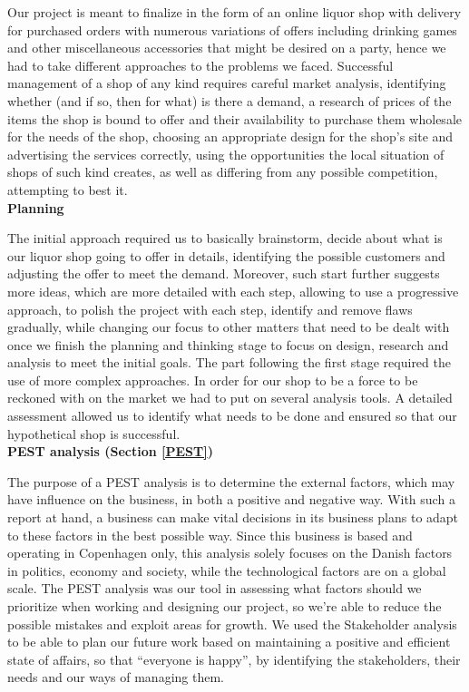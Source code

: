 \documentclass[12p]{article}
\begin{document}
Our project is meant to finalize in the form of an online liquor shop with delivery for purchased orders with numerous variations of offers including drinking games and other miscellaneous accessories that might be desired on a party, hence we had to take different approaches to the problems we faced. Successful management of a shop of any kind requires careful market analysis, identifying whether (and if so, then for what) is there a demand, a research of prices of the items the shop is bound to offer and their availability to purchase them wholesale for the needs of the shop, choosing an appropriate design for the shop’s site and advertising the services correctly, using the opportunities the local situation of shops of such kind creates, as well as differing from any possible competition, attempting to best it. \\

\textbf{Planning}

The initial approach required us to basically brainstorm, decide about what is our liquor shop going to offer in details, identifying the possible customers and adjusting the offer to meet the demand. Moreover, such start further suggests more ideas, which are more detailed with each step, allowing to use a progressive approach, to polish the project with each step, identify and remove flaws gradually, while changing our focus to other matters that need to be dealt with once we finish the planning and thinking stage to focus on design, research and analysis to meet the initial goals.
The part following the first stage required the use of more complex approaches. In order for our shop to be a force to be reckoned with on the market we had to put on several analysis tools. A detailed assessment allowed us to identify what needs to be done and ensured so that our hypothetical shop is successful. \\

\textbf{PEST analysis (Section \ref{PEST})}

The purpose of a PEST analysis is to determine the external factors, which may have influence on the business, in both a positive and negative way. With such a report at hand, a business can make vital decisions in its business plans to adapt to these factors in the best possible way. Since this business is based and operating in Copenhagen only, this analysis solely focuses on the Danish factors in politics, economy and society, while the technological factors are on a global scale. The PEST analysis was our tool in assessing what factors should we prioritize when working and designing our project, so we’re able to reduce the possible mistakes and exploit areas for growth.
We used the Stakeholder analysis to be able to plan our future work based on maintaining a positive and efficient state of affairs, so that “everyone is happy”, by identifying the stakeholders, their needs and our ways of managing them. \\
\end{document}
